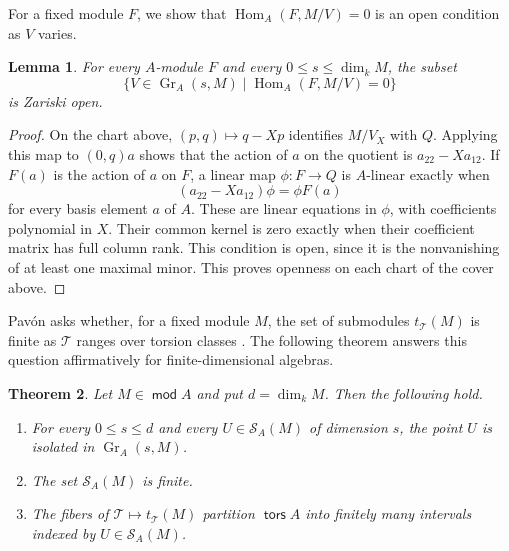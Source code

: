 \documentclass[a4paper,reqno,10pt]{amsart}
\newtheorem{theorem}{Theorem}[section]
\newtheorem{lemma}[theorem]{Lemma}
\theoremstyle{definition}
\numberwithin{equation}{section}
\newcommand{\kfield}{k}
\newcommand{\Hom}{\operatorname{Hom}}
\newcommand{\Gr}{\operatorname{Gr}}
\DeclareMathOperator{\tors}{\mathsf{tors}}
\DeclareMathOperator{\modu}{\mathsf{mod}}
\newcommand{\T}{\mathcal T}
\newcommand{\Sol}{\mathcal S}
\begin{document}
For a fixed module $F$, we show that $\Hom_A(F,M/V)=0$ is an open
condition as $V$ varies.

\begin{lemma}\label{lem:hom-open}
For every $A$-module $F$ and every $0\leq s\leq\dim_k M$, the subset
\[
 \{V\in\Gr_A(s,M)\mid\Hom_A(F,M/V)=0\}
\]
is Zariski open.
\end{lemma}

\begin{proof}
On the chart above, $(p,q)\mapsto q-Xp$ identifies $M/V_X$ with $Q$.
Applying this map to $(0,q)a$ shows that the action of $a$ on the
quotient is $a_{22}-Xa_{12}$. If $F(a)$ is the action of $a$ on $F$,
a linear map $\phi:F\to Q$ is $A$-linear exactly when
\[
 (a_{22}-Xa_{12})\phi=\phi F(a)
\]
for every basis element $a$ of $A$. These are linear equations in
$\phi$, with coefficients polynomial in $X$. Their common kernel is
zero exactly when their coefficient matrix has full column rank.
This condition is open, since it is the nonvanishing of at least one
maximal minor. This proves openness on each chart of the cover above.
\end{proof}

Pav\'on asks whether, for a fixed module $M$, the set of submodules
$t_\T(M)$ is finite as $\T$ ranges over torsion classes
\cite[Question~2.19]{Pavon}. The following theorem answers this question
affirmatively for finite-dimensional algebras.

\begin{theorem}\label{thm:solid-finite}
Let $M\in\modu A$ and put $d=\dim_\kfield M$. Then the following hold.
\begin{enumerate}
\item\label{item:solid-isolated} For every $0\leq s\leq d$ and every
$U\in\Sol_A(M)$ of dimension $s$, the point $U$ is isolated in
$\Gr_A(s,M)$.
\item\label{item:solid-finite} The set $\Sol_A(M)$ is finite.
\item\label{item:solid-intervals} The fibers of
$\T\mapsto t_\T(M)$ partition $\tors A$ into finitely many intervals
indexed by $U\in\Sol_A(M)$.
\end{enumerate}
\end{theorem}
\end{document}
